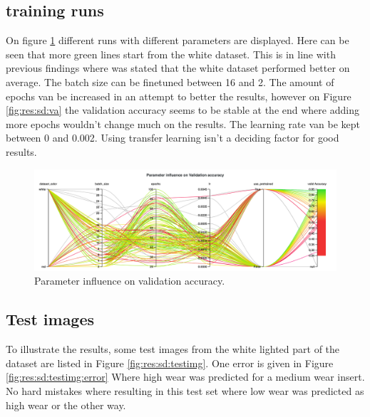 \subsection{training runs}
	On figure \ref{fig:res:sd:tr} different runs with different parameters are displayed. Here can be seen that more green lines start from the white dataset. This is in line with previous findings where was stated that the white dataset performed better on average. The batch size can be finetuned between 16 and 2. The amount of epochs van be increased in an attempt to better the results, however on Figure \ref{fig:res:sd:va} the validation accuracy seems to be stable at the end where adding more epochs wouldn't change much on the results. The learning rate van be kept between 0 and 0.002. Using transfer learning isn't a deciding factor for good results. 

	\begin{figure}[hbtp]
		\centering
		\includegraphics[width=\linewidth]{fig/results/wandb/spaghetti_dataset/charts/Section-19-Panel-0-alqny4fc9}
		\caption{Parameter influence on validation accuracy.}	
		\label{fig:res:sd:tr}
	\end{figure}
	
\subsection{Test images}
	To illustrate the results, some test images from the white lighted part of the dataset are listed in Figure \ref{fig:res:sd:testimg}. One error is given in Figure \ref{fig:res:sd:testimg:error} Where high wear was predicted for a medium wear insert. No hard mistakes where resulting in this test set where low wear was predicted as high wear or the other way.



